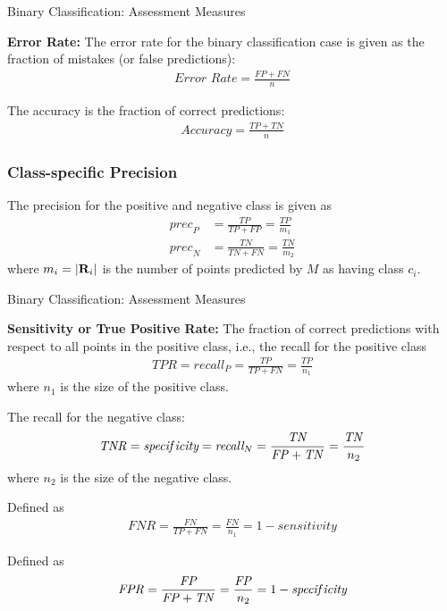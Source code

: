 \begin{frame}{Binary Classif\/{i}cation: Assessment Measures}

{\bf Error Rate:} 
The error rate for the
binary classif\/{i}cation case is given as the fraction of mistakes
(or false predictions):
\begin{align*}
\textit{Error\ Rate} = \frac{\mathit{FP}+\mathit{FN}}{n}
\end{align*}

The accuracy is the fraction
of correct predictions:
\begin{align*}
\textit{Accuracy} = \frac{\mathit{TP}+\mathit{TN}}{n}
\end{align*}

\subsubsection{Class-specif\/{i}c Precision}
The precision for the positive
and negative class is given as
\begin{align*}
  \textit{prec}_P &= \frac{\mathit{TP}}{\mathit{TP}+\mathit{FP}} = \frac{\mathit{TP}}{m_1}\\
  \textit{prec}_N & = \frac{\mathit{TN}}{\mathit{TN}+\mathit{FN}} = \frac{\mathit{TN}}{m_2}
\end{align*}
where $m_i = |\mathbf{R}_i|$ is the number of points predicted by $M$ as
having class $c_i$.
\end{frame}

\begin{frame}{Binary Classif\/{i}cation: Assessment Measures}

{\bf Sensitivity or True Positive Rate:}
The fraction of correct predictions with respect
to all points in the positive class, i.e., the
recall for the positive class
\begin{align*}
  \mathit{TPR} = \textit{recall}_P = \frac{\mathit{TP}}{\mathit{TP}+\mathit{FN}} = \frac{\mathit{TP}}{n_1}
\end{align*}
where $n_1$ is the size of the positive class.

The recall for the negative class:
\begin{align*}
  \mathit{TNR} = \textit{specif\/{i}city} = \textit{recall}_N = \frac{\mathit{TN}}{\mathit{FP}+\mathit{TN}} = \frac{\mathit{TN}}{n_2}
\end{align*}
where $n_2$ is the size of the negative class.

 Def\/{i}ned as
\begin{align*}
  \mathit{FNR} = \frac{\mathit{FN}}{\mathit{TP}+\mathit{FN}} = \frac{\mathit{FN}}{n_1}  = 1 - \textit{sensitivity}
\end{align*}

 Def\/{i}ned as
\begin{align*}
  \mathit{FPR} = \frac{\mathit{FP}}{\mathit{FP}+\mathit{TN}} = \frac{\mathit{FP}}{n_2}= 1 - \textit{specif\/{i}city}
\end{align*}
\end{frame}




